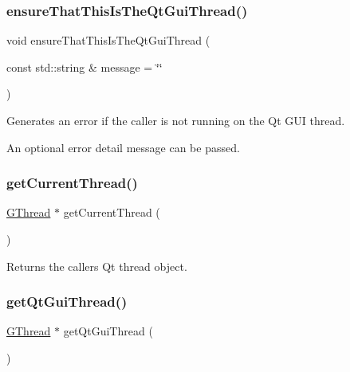 \subsubsection{\texorpdfstring{ensure\+That\+This\+Is\+The\+Qt\+Gui\+Thread()}{ensureThatThisIsTheQtGuiThread()}}
{\footnotesize\ttfamily void ensure\+That\+This\+Is\+The\+Qt\+Gui\+Thread (\begin{DoxyParamCaption}\item[{const std\+::string \&}]{message = {\ttfamily \char`\"{}\char`\"{}} }\end{DoxyParamCaption})\hspace{0.3cm}{\ttfamily [static]}}



Generates an error if the caller is not running on the Qt G\+UI thread. 

An optional error detail message can be passed. \mbox{\label{classGThread_aaa459934e7c2be37d30ed64ab5dd8dbe}} 
\subsubsection{\texorpdfstring{get\+Current\+Thread()}{getCurrentThread()}}
{\footnotesize\ttfamily \mbox{\hyperlink{classGThread}{G\+Thread}} $\ast$ get\+Current\+Thread (\begin{DoxyParamCaption}{ }\end{DoxyParamCaption})\hspace{0.3cm}{\ttfamily [static]}}



Returns the caller\textquotesingle{}s Qt thread object. 

\mbox{\label{classGThread_ac141b7dd2d0dfa84f52db332569623fc}} 
\subsubsection{\texorpdfstring{get\+Qt\+Gui\+Thread()}{getQtGuiThread()}}
{\footnotesize\ttfamily \mbox{\hyperlink{classGThread}{G\+Thread}} $\ast$ get\+Qt\+Gui\+Thread (\begin{DoxyParamCaption}{ }\end{DoxyParamCaption})\hspace{0.3cm}{\ttfamily [static]}}



